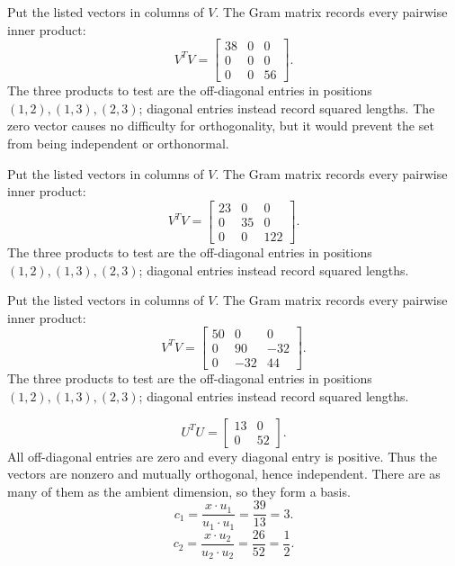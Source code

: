 Put the listed vectors in columns of $V$. The Gram matrix records every pairwise inner product:
\[V^TV=\left[\begin{array}{rrr}38&0&0\\0&0&0\\0&0&56\end{array}\right].\]
The three products to test are the off-diagonal entries in positions $(1,2),(1,3),(2,3)$; diagonal entries instead record squared lengths.
The zero vector causes no difficulty for orthogonality, but it would prevent the set from being independent or orthonormal.

Put the listed vectors in columns of $V$. The Gram matrix records every pairwise inner product:
\[V^TV=\left[\begin{array}{rrr}23&0&0\\0&35&0\\0&0&122\end{array}\right].\]
The three products to test are the off-diagonal entries in positions $(1,2),(1,3),(2,3)$; diagonal entries instead record squared lengths.

Put the listed vectors in columns of $V$. The Gram matrix records every pairwise inner product:
\[V^TV=\left[\begin{array}{rrr}50&0&0\\0&90&-32\\0&-32&44\end{array}\right].\]
The three products to test are the off-diagonal entries in positions $(1,2),(1,3),(2,3)$; diagonal entries instead record squared lengths.

\[U^TU=\left[\begin{array}{rr}13&0\\0&52\end{array}\right].\]
All off-diagonal entries are zero and every diagonal entry is positive. Thus the vectors are nonzero and mutually orthogonal, hence independent. There are as many of them as the ambient dimension, so they form a basis.
\[c_{1}=\frac{x\cdot u_{1}}{u_{1}\cdot u_{1}}=\frac{39}{13}=3.\]
\[c_{2}=\frac{x\cdot u_{2}}{u_{2}\cdot u_{2}}=\frac{26}{52}=\frac{1}{2}.\]

